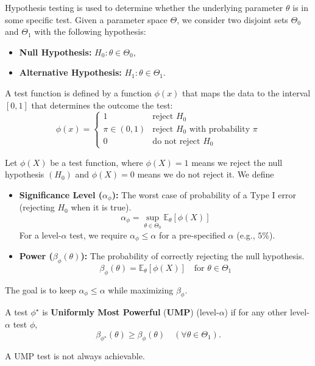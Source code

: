 \begin{de}
   Hypothesis testing is used to determine whether the underlying parameter $\theta$ is in some specific test. Given a parameter space $\Theta$, we consider two disjoint sets $\Theta_0$ and $\Theta_1$ with the following hypothesis:
    \begin{itemize}
            \item \textbf{Null Hypothesis:} $H_0: \theta \in \Theta_0$,
            \item \textbf{Alternative Hypothesis:} $H_1: \theta \in \Theta_1$.
    \end{itemize}
   A test function is defined by a function $\phi(x)$ that maps the data to the interval $[0,1]$ that determines the outcome the test:
    \[
    \phi(x) = \begin{cases} 
    1 & \text{reject } H_0 \\
    \pi\in(0,1) & \text{reject $H_0$ with probability $\pi$} \\
    0 & \text{do not reject } H_0 
    \end{cases}
    \]
\end{de}
\begin{de}
    Let $\phi(X)$ be a test function, where $\phi(X) = 1$ means we reject the null hypothesis $(H_0)$ and $\phi(X) = 0$ means we do not reject it. We define
\begin{itemize}
    \item \textbf{Significance Level ($\alpha_{\phi}$):} The worst case of probability of a Type I error (rejecting $H_0$ when it is true).
    $$\alpha_{\phi} = \sup_{\theta \in \Theta_0} \mathbb{E}_{\theta}[\phi(X)]$$
    For a level-$\alpha$ test, we require $\alpha_{\phi} \le \alpha$ for a pre-specified $\alpha$ (e.g., $5\%$).
    \item \textbf{Power ($\beta_{\phi}(\theta)$):} The probability of correctly rejecting the null hypothesis.
    $$\beta_{\phi}(\theta) = \mathbb{E}_{\theta}[\phi(X)] \quad \text{for } \theta \in \Theta_1$$
\end{itemize}
\end{de}
\begin{remark}
    The goal is to keep $\alpha_{\phi} \le \alpha$ while maximizing $\beta_{\phi}$.
\end{remark}
\begin{de}
    A test $\phi^{\star}$ is \textbf{Uniformly Most Powerful} ($\mathbf{UMP}$) (level-$\alpha$) if for any other level-$\alpha$ test $\phi$,
$$\beta_{\phi^{\star}}(\theta) \ge \beta_{\phi}(\theta) \quad (\forall \theta \in \Theta_1).$$
\end{de}
\begin{remark}
    A UMP test is not always achievable.
\end{remark}

